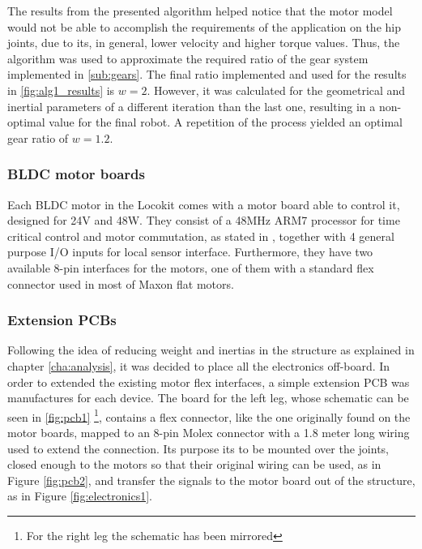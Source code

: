 The results from the presented algorithm helped notice that the motor model would not be able to accomplish the requirements of the application on the hip joints, due to its, in general, lower velocity and higher torque values.
Thus, the algorithm was used to approximate the required ratio of the gear system implemented in \ref{sub:gears}.
The final ratio implemented and used for the results in \ref{fig:alg1_results} is $w=2$. 
However, it was calculated for the geometrical and inertial parameters of a different iteration than the last one, resulting in a non-optimal value for the final robot.
A repetition of the process yielded an optimal gear ratio of $w=1.2$.

















\subsubsection{BLDC motor boards} %
\label{ssub:bldc_motor_boards}
Each BLDC motor in the Locokit comes with a motor board able to control it, designed for 24V and 48W.
They consist of a 48MHz ARM7 processor for time critical control and motor commutation, as stated in \cite{locokit-electronics}, together with 4 general purpose I/O inputs for local sensor interface.
Furthermore, they have two available 8-pin interfaces for the motors, one of them with a standard flex connector used in most of Maxon flat motors.


\subsubsection{Extension PCBs} %
\label{ssub:extension_pcbs}
Following the idea of reducing weight and inertias in the structure as explained in chapter \ref{cha:analysis}, it was decided to place all the electronics off-board.
In order to extended the existing motor flex interfaces, a simple extension PCB was manufactures for each device.
The board for the left leg, whose schematic can be seen in \ref{fig:pcb1} \footnote{For the right leg the schematic has been mirrored}, contains a flex connector, like the one originally found on the motor boards, mapped to an 8-pin Molex connector with a 1.8 meter long wiring used to extend the connection.
Its purpose its to be mounted over the joints, closed enough to the motors so that their original wiring can be used, as in Figure \ref{fig:pcb2}, and transfer the signals to the motor board out of the structure, as in Figure \ref{fig:electronics1}.

